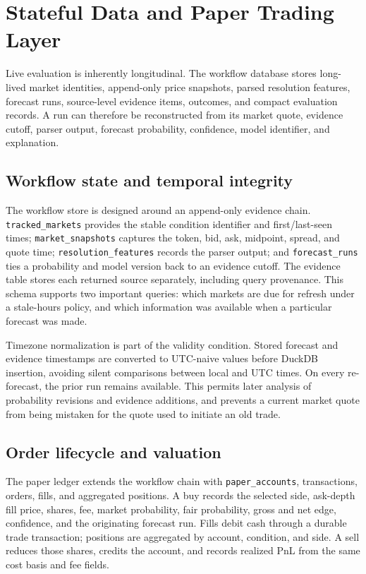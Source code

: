 \section{Stateful Data and Paper Trading Layer}

Live evaluation is inherently longitudinal. The workflow database stores long-lived market identities, append-only price snapshots, parsed resolution features, forecast runs, source-level evidence items, outcomes, and compact evaluation records. A run can therefore be reconstructed from its market quote, evidence cutoff, parser output, forecast probability, confidence, model identifier, and explanation.

\subsection{Workflow state and temporal integrity}

The workflow store is designed around an append-only evidence chain. \texttt{tracked\_markets} provides the stable condition identifier and first/last-seen times; \texttt{market\_snapshots} captures the token, bid, ask, midpoint, spread, and quote time; \texttt{resolution\_features} records the parser output; and \texttt{forecast\_runs} ties a probability and model version back to an evidence cutoff. The evidence table stores each returned source separately, including query provenance. This schema supports two important queries: which markets are due for refresh under a stale-hours policy, and which information was available when a particular forecast was made.

Timezone normalization is part of the validity condition. Stored forecast and evidence timestamps are converted to UTC-naive values before DuckDB insertion, avoiding silent comparisons between local and UTC times. On every re-forecast, the prior run remains available. This permits later analysis of probability revisions and evidence additions, and prevents a current market quote from being mistaken for the quote used to initiate an old trade.

\subsection{Order lifecycle and valuation}

The paper ledger extends the workflow chain with \texttt{paper\_accounts}, transactions, orders, fills, and aggregated positions. A buy records the selected side, ask-depth fill price, shares, fee, market probability, fair probability, gross and net edge, confidence, and the originating forecast run. Fills debit cash through a durable trade transaction; positions are aggregated by account, condition, and side. A sell reduces those shares, credits the account, and records realized PnL from the same cost basis and fee fields.

